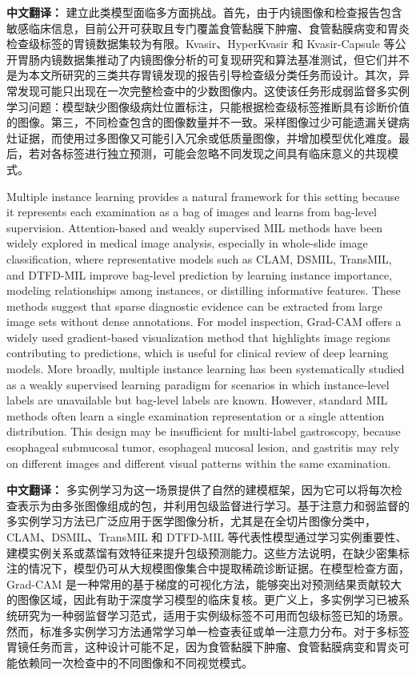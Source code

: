 \documentclass[Afour,sagev,times]{sagej}
\begin{document}
\textbf{中文翻译：} 建立此类模型面临多方面挑战。首先，由于内镜图像和检查报告包含敏感临床信息，目前公开可获取且专门覆盖食管黏膜下肿瘤、食管黏膜病变和胃炎检查级标签的胃镜数据集较为有限。Kvasir、HyperKvasir 和 Kvasir-Capsule 等公开胃肠内镜数据集推动了内镜图像分析的可复现研究和算法基准测试，但它们并不是为本文所研究的三类共存胃镜发现的报告引导检查级分类任务而设计。其次，异常发现可能只出现在一次完整检查中的少数图像内。这使该任务形成弱监督多实例学习问题：模型缺少图像级病灶位置标注，只能根据检查级标签推断具有诊断价值的图像。第三，不同检查包含的图像数量并不一致。采样图像过少可能遗漏关键病灶证据，而使用过多图像又可能引入冗余或低质量图像，并增加模型优化难度。最后，若对各标签进行独立预测，可能会忽略不同发现之间具有临床意义的共现模式。

Multiple instance learning provides a natural framework for this setting because it represents each examination as a bag of images and learns from bag-level supervision. Attention-based and weakly supervised MIL methods have been widely explored in medical image analysis, especially in whole-slide image classification, where representative models such as CLAM, DSMIL, TransMIL, and DTFD-MIL improve bag-level prediction by learning instance importance, modeling relationships among instances, or distilling informative features.\cite{R8,R9,R10,R11} These methods suggest that sparse diagnostic evidence can be extracted from large image sets without dense annotations. For model inspection, Grad-CAM offers a widely used gradient-based visualization method that highlights image regions contributing to predictions, which is useful for clinical review of deep learning models.\cite{R12} More broadly, multiple instance learning has been systematically studied as a weakly supervised learning paradigm for scenarios in which instance-level labels are unavailable but bag-level labels are known.\cite{R13} However, standard MIL methods often learn a single examination representation or a single attention distribution. This design may be insufficient for multi-label gastroscopy, because esophageal submucosal tumor, esophageal mucosal lesion, and gastritis may rely on different images and different visual patterns within the same examination.

\textbf{中文翻译：} 多实例学习为这一场景提供了自然的建模框架，因为它可以将每次检查表示为由多张图像组成的包，并利用包级监督进行学习。基于注意力和弱监督的多实例学习方法已广泛应用于医学图像分析，尤其是在全切片图像分类中，CLAM、DSMIL、TransMIL 和 DTFD-MIL 等代表性模型通过学习实例重要性、建模实例关系或蒸馏有效特征来提升包级预测能力。这些方法说明，在缺少密集标注的情况下，模型仍可从大规模图像集合中提取稀疏诊断证据。在模型检查方面，Grad-CAM 是一种常用的基于梯度的可视化方法，能够突出对预测结果贡献较大的图像区域，因此有助于深度学习模型的临床复核。更广义上，多实例学习已被系统研究为一种弱监督学习范式，适用于实例级标签不可用而包级标签已知的场景。然而，标准多实例学习方法通常学习单一检查表征或单一注意力分布。对于多标签胃镜任务而言，这种设计可能不足，因为食管黏膜下肿瘤、食管黏膜病变和胃炎可能依赖同一次检查中的不同图像和不同视觉模式。
\end{document}
